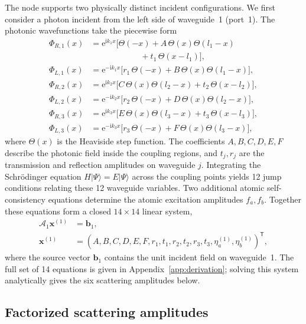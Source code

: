 \documentclass[aps,pra,reprint,superscriptaddress,nofootinbib,longbibliography,floatfix]{revtex4-2}
\newcommand{\ii}{\mathrm{i}}
\newcommand{\ee}{\mathrm{e}}
\begin{document}
The node supports two physically distinct incident configurations.
We first consider a photon incident from the left side of waveguide~1 (port~1).
The photonic wavefunctions take the piecewise form
\begin{subequations}
\label{eq:wg1_ansatz}
\begin{align}
\Phi_{R,1}(x) &= \ee^{\ii k_1 x}\bigl[\Theta(-x) + A\,\Theta(x)\Theta(l_1-x) \nonumber\\
&\qquad\qquad\qquad + t_1\,\Theta(x-l_1)\bigr],\\
\Phi_{L,1}(x) &= \ee^{-\ii k_1 x}\bigl[r_1\,\Theta(-x) + B\,\Theta(x)\Theta(l_1-x)\bigr],\\
\Phi_{R,2}(x) &= \ee^{\ii k_2 x}\bigl[C\,\Theta(x)\Theta(l_2-x) + t_2\,\Theta(x-l_2)\bigr],\\
\Phi_{L,2}(x) &= \ee^{-\ii k_2 x}\bigl[r_2\,\Theta(-x) + D\,\Theta(x)\Theta(l_2-x)\bigr],\\
\Phi_{R,3}(x) &= \ee^{\ii k_3 x}\bigl[E\,\Theta(x)\Theta(l_3-x) + t_3\,\Theta(x-l_3)\bigr],\\
\Phi_{L,3}(x) &= \ee^{-\ii k_3 x}\bigl[r_3\,\Theta(-x) + F\,\Theta(x)\Theta(l_3-x)\bigr],
\end{align}
\end{subequations}
where $\Theta(x)$ is the Heaviside step function.
The coefficients $A,B,C,D,E,F$ describe the photonic field inside the coupling regions, and $t_j,r_j$ are the transmission and reflection amplitudes on waveguide $j$.
Integrating the Schr\"{o}dinger equation $H|\Psi\rangle = E|\Psi\rangle$ across the coupling points yields 12 jump conditions relating these 12 waveguide variables.
Two additional atomic self-consistency equations determine the atomic excitation amplitudes $f_a,f_b$.
Together these equations form a closed $14\times14$ linear system,
\begin{equation}
\begin{aligned}
\mathcal{A}_1\mathbf{x}^{(1)}&=\mathbf{b}_1,\\
\mathbf{x}^{(1)}
&= (A,B,C,D,E,F,r_1,t_1,r_2,t_2,r_3,t_3,
\eta_a^{(1)},\eta_b^{(1)})^{\mathsf T},
\end{aligned}
\label{eq:linear_wg1}
\end{equation}
where the source vector $\mathbf{b}_1$ contains the unit incident field on waveguide~1.
The full set of 14 equations is given in Appendix~\ref{app:derivation}; solving this system analytically gives the six scattering amplitudes below.

\subsection{Factorized scattering amplitudes}
\end{document}
